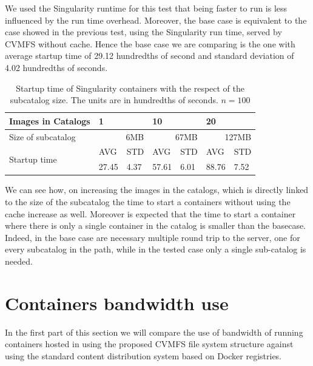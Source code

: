 We used the Singularity runtime for this test that being faster to run is less
influenced by the run time overhead. Moreover, the base case is equivalent to
the case showed in the previous test, using the Singularity run time, served by
CVMFS without cache. Hence the base case we are comparing is the one with
average startup time of 29.12 hundredths of second and standard deviation of
4.02 hundredths of seconds. 

\begin{table}[]
        \begin{tabular}{|l|ll|ll|ll|}
                \hline
                Images in Catalogs            & \multicolumn{2}{l|}{1}  & \multicolumn{2}{l|}{10}  & \multicolumn{2}{l|}{20}   \\ \hline
                Size of subcatalog            & \multicolumn{2}{r|}{6MB} & \multicolumn{2}{r|}{67MB} & \multicolumn{2}{r|}{127MB} \\ \hline
                \multirow{2}{*}{Startup time} & AVG         & STD       & AVG          & STD       & AVG          & STD        \\ \cline{2-7} 
                                              & 27.45       & 4.37      & 57.61        & 6.01      & 88.76        & 7.52       \\ \hline
        \end{tabular}
\caption{Startup time of Singularity containers with the respect of the subcatalog size. The units are in hundredths of seconds. $n = 100$}
\label{tab:benchmark-catalog}
        \end{table}

We can see how, on increasing the images in the catalogs, which is directly
linked to the size of the subcatalog the time to start a containers without
using the cache increase as well. Moreover is expected that the time to start a
container where there is only a single container in the catalog is smaller than
the basecase. Indeed, in the base case are necessary multiple round trip to the
server, one for every subcatalog in the path, while in the tested case only a
single sub-catalog is needed.

\section{Containers bandwidth use}

In the first part of this section we will compare the use of bandwidth of
running containers hosted in using the proposed CVMFS file system structure
against using the standard content distribution system based on Docker
registries.

